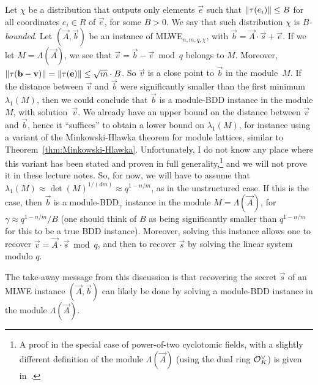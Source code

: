 Let $\chi$ be a distribution that outputs only elements $\vec e$ such that $\|\tau(e_i)\| \leq B$ for all coordinates $e_i \in R$ of $\vec e$, for some $B > 0$. We say that such distribution $\chi$ is \emph{$B$-bounded}.
Let $(\vec A, \vec b)$ be an instance of MLWE$_{n,m,q,\chi}$, with $\vec b = \vec A \cdot \vec s + \vec e$.  If we let $M = \Lambda(\vec A)$, we see that $\vec v = \vec b - \vec e \bmod q$ belongs to $M$. Moreover, $\|\tau(\mathbf b - \mathbf v)\| =  \| \tau(\mathbf e)\| \leq \sqrt{m} \cdot B$. So $\vec v$ is a close point to $\vec b$ in the module~$M$. If the distance between $\vec v$ and $\vec b$ were significantly smaller than the first minimum $\lambda_1(M)$, then we could conclude that $\vec b$ is a module-BDD instance in the module $M$, with solution~$\vec v$. We already have an upper bound on the distance between $\vec v$ and $\vec b$, hence it ``suffices'' to obtain a lower bound on $\lambda_1(M)$, for instance using a variant of the Minkowski-Hlawka theorem for module lattices, similar to Theorem~\ref{thm:Minkowski-Hlawka}. Unfortunately, I do not know any place where this variant has been stated and proven in full generality,\footnote{A proof in the special case of power-of-two cyclotomic fields, with a slightly different definition of the module $\Lambda(\vec A)$ (using the dual ring $\mathcal{O}_K^\vee$) is given in~\cite[Lemma 5.1]{MLWE2}.}
 and we will not prove it in these lecture notes. So, for now, we will have to assume that $\lambda_1(M) \approx \det(M)^{1/(dm)} \approx q^{1-n/m}$, as in the unstructured case. If this is the case, then $\vec b$ is a module-BDD$_\gamma$ instance in the module $M = \Lambda(\vec A)$, for $\gamma \approx q^{1-n/m}/B$ (one should think of $B$ as being significantly smaller than $q^{1-n/m}$ for this to be a true BDD instance).
Moreover, solving this instance allows one to recover $\vec v = \vec A \cdot \vec s \bmod q$, and then to recover $\vec s$ by solving the linear system modulo $q$.

The take-away message from this discussion is that recovering the secret $\vec s$ of an MLWE instance $(\vec A, \vec b)$ can likely be done by solving a module-BDD instance in the module $\Lambda(\vec A)$.




